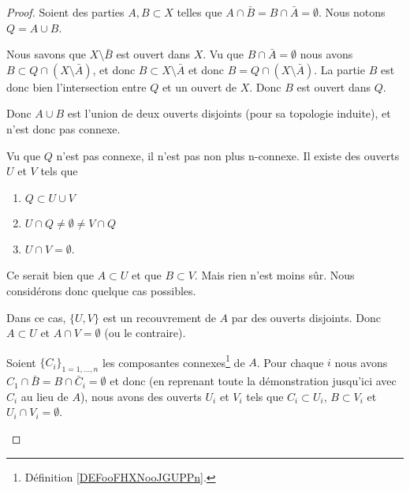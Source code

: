 \begin{proof}
	Soient des parties \( A,B\subset X\)  telles que \( A\cap\bar B=B\cap\bar A=\emptyset\). Nous notons \( Q=A\cup B\).
	\begin{subproof}
		\spitem[\( B\) est ouvert dans \(Q= A\cup B\)]
		Nous savons que \( X\setminus \bar B\) est ouvert dans \( X\). Vu que \( B\cap\bar A=\emptyset\) nous avons \( B\subset Q\cap(X\setminus\bar A)\), et donc \( B\subset X\setminus \bar A\) et donc \( B=Q\cap(X\setminus \bar A)\). La partie \( B\) est donc bien l'intersection entre \( Q\) et un ouvert de \( X\). Donc \( B\) est ouvert dans \( Q\).

		Donc \( A\cup B\) est l'union de deux ouverts disjoints (pour sa topologie induite), et n'est donc pas connexe.

		Vu que \( Q\) n'est pas connexe, il n'est pas non plus n-connexe. Il existe des ouverts \( U\) et \( V\) tels que
		\begin{enumerate}
			\item
			      \( Q\subset U\cup V\)
			\item
			      \( U\cap Q\neq\emptyset\neq V\cap Q\)
			\item
			      \( U\cap V=\emptyset\).
		\end{enumerate}

		Ce serait bien que \( A\subset U\) et que \( B\subset V\). Mais rien n'est moins sûr. Nous considérons donc quelque cas possibles.

		Dans ce cas, \( \{ U,V \}\) est un recouvrement de \( A\) par des ouverts disjoints. Donc \( A\subset U\) et \( A\cap V=\emptyset\) (ou le contraire).

		Soient \( \{ C_i \}_{1=1,\ldots,n}\) les composantes connexes\footnote{Définition \ref{DEFooFHXNooJGUPPn}.} de \( A\). Pour chaque \( i\) nous avons \( C_1\cap\bar B=B\cap\bar C_i=\emptyset\) et donc (en reprenant toute la démonstration jusqu'ici avec \( C_i\) au lieu de \( A\)), nous avons des ouverts \( U_i\) et \( V_i\) tels que \( C_i\subset U_i\), \( B\subset V_i\) et \( U_i\cap V_i= \emptyset\). %


\end{subproof}
\end{proof}
